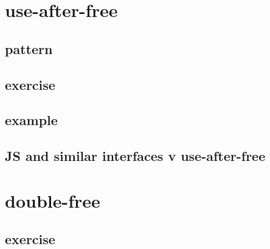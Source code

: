 \section{use-after-free}


\subsection{pattern}


\subsection{exercise}


\subsection{example}


\subsection{JS and similar interfaces v use-after-free}


\section{double-free}


\subsection{exercise}


